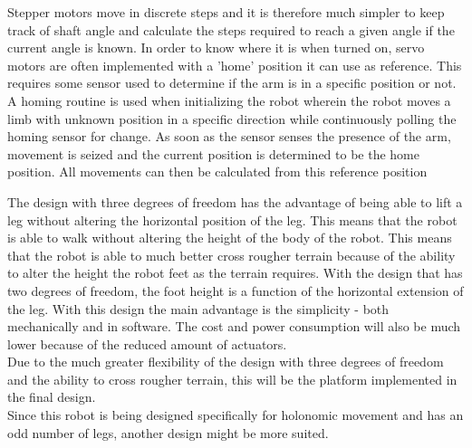Stepper motors move in discrete steps and it is therefore much simpler to keep track of shaft angle and calculate the steps required to reach a given angle if the current angle is known. In order to know where it is when turned on, servo motors are often implemented with a 'home' position it can use as reference. This requires some sensor used to determine if the arm is in a specific position or not. A homing routine is used when initializing the robot wherein the robot moves a limb with unknown position in a specific direction while continuously polling the homing sensor for change. As soon as the sensor senses the presence of the arm, movement is seized and the current position is determined to be the home position. All movements can then be calculated from this reference position

The design with three degrees of freedom has the advantage of being able to lift a leg without altering the horizontal position of the leg. This means that the robot is able to walk without altering the height of the body of the robot. This means that the robot is able to much better cross rougher terrain because of the ability to alter the height the robot feet as the terrain requires. With the design that has two degrees of freedom, the foot height is a function of the horizontal extension of the leg. With this design the main advantage is the simplicity - both mechanically and in software. The cost and power consumption will also be much lower because of the reduced amount of actuators.\\

Due to the much greater flexibility of the design with three degrees of freedom and the ability to cross rougher terrain, this will be the platform implemented in the final design.\\

Since this robot is being designed specifically for holonomic movement and has an odd number of legs, another design might be more suited.